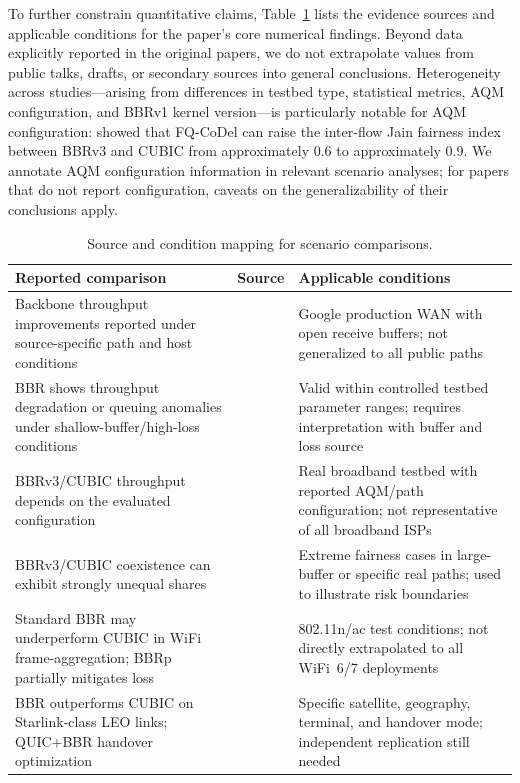 \documentclass[a4paper,fleqn]{cas-sc}
\begin{document}
To further constrain quantitative claims, Table~\ref{tab:evidence_matrix} lists
the evidence sources and applicable conditions for the paper's core numerical
findings. Beyond data explicitly reported in the original papers, we do not
extrapolate values from public talks, drafts, or secondary sources into general
conclusions. Heterogeneity across studies---arising from differences in testbed
type, statistical metrics, AQM configuration, and BBRv1 kernel version---is
particularly notable for AQM configuration: \citet{pokhrel2025wifi} showed that
FQ-CoDel can raise the inter-flow Jain fairness index between BBRv3 and CUBIC
from approximately 0.6 to approximately 0.9. We annotate AQM configuration
information in relevant scenario analyses; for papers that do not report
configuration, caveats on the generalizability of their conclusions apply.

\begin{table}[pos=tbp]
  \caption{Source and condition mapping for scenario comparisons.}
  \label{tab:evidence_matrix}
  \small
  \begin{tabularx}{\tblwidth}{@{}p{4.2cm}p{2.8cm}X@{}}
    \toprule
    \textbf{Reported comparison} & \textbf{Source} & \textbf{Applicable conditions} \\
    \midrule
    Backbone throughput improvements reported under source-specific path and host conditions &
      \citet{cardwell2017bbr} &
      Google production WAN with open receive buffers; not generalized to all public paths \\
    BBR shows throughput degradation or queuing anomalies under shallow-buffer/high-loss conditions &
      \citet{cao2019bbr,jaeger2019bbr} &
      Valid within controlled testbed parameter ranges; requires interpretation with buffer and loss source \\
    BBRv3/CUBIC throughput depends on the evaluated configuration &
      \citet{gomez2024bbrv3} &
      Real broadband testbed with reported AQM/path configuration; not representative of all broadband ISPs \\
    BBRv3/CUBIC coexistence can exhibit strongly unequal shares &
      \citet{abrol2026bbr,zeynali2024bbrv3} &
      Extreme fairness cases in large-buffer or specific real paths; used to illustrate risk boundaries \\
    Standard BBR may underperform CUBIC in WiFi frame-aggregation; BBRp partially mitigates loss &
      \citet{grazia2020bbrp} &
      802.11n/ac test conditions; not directly extrapolated to all WiFi~6/7 deployments \\
    BBR outperforms CUBIC on Starlink-class LEO links; QUIC+BBR handover optimization &
      \citet{deutschmann2023starlink,kamel2024starquic} &
      Specific satellite, geography, terminal, and handover mode; independent replication still needed \\
    \bottomrule
  \end{tabularx}
\end{table}
\end{document}
